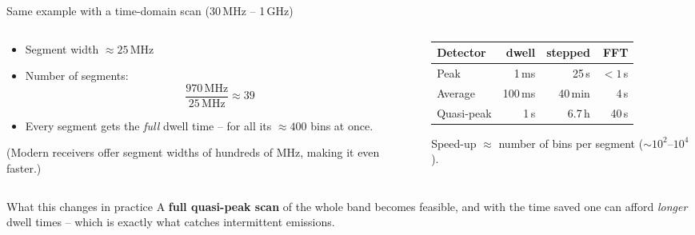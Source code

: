 \documentclass[aspectratio=169]{beamer}
\begin{document}
\begin{frame}{Same example with a time-domain scan (30\,MHz -- 1\,GHz)}

\begin{columns}[T]
\begin{column}{0.48\textwidth}
  \begin{itemize}
    \item Segment width $\approx 25$\,MHz
    \item Number of segments:
      \[ \frac{970\,\mathrm{MHz}}{25\,\mathrm{MHz}} \approx 39 \]
    \item Every segment gets the \emph{full} dwell time -- for all its
          $\approx 400$ bins at once.
  \end{itemize}
  \scriptsize
  (Modern receivers offer segment widths of hundreds of MHz, making it
  even faster.)
\end{column}
\begin{column}{0.49\textwidth}
  \centering
  \begin{tabular}{@{}lrrr@{}}
    \toprule
    Detector & dwell & \textcolor{stepc}{stepped} & \textcolor{fftc}{FFT} \\
    \midrule
    Peak       & 1\,ms   & 25\,s      & $<1$\,s \\
    Average    & 100\,ms & 40\,min    & 4\,s \\
    Quasi-peak & 1\,s    & 6.7\,h     & \alert{40\,s} \\
    \bottomrule
  \end{tabular}

  \medskip
  \small Speed-up $\approx$ number of bins per segment
  ($\sim 10^2$--$10^4$).
\end{column}
\end{columns}

\bigskip
\begin{exampleblock}{What this changes in practice}
  A \textbf{full quasi-peak scan} of the whole band becomes feasible, and with
  the time saved one can afford \emph{longer} dwell times -- which is exactly
  what catches intermittent emissions.
\end{exampleblock}

\end{frame}
\end{document}
